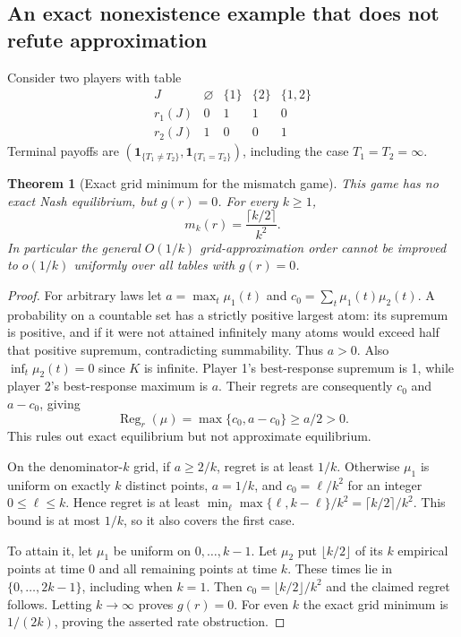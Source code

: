 \documentclass[11pt,a4paper]{article}
\newcommand{\ind}{\mathbf 1}
\DeclareMathOperator{\Reg}{Reg}
\newtheorem{theorem}{Theorem}[section]
\theoremstyle{definition}
\theoremstyle{remark}
\begin{document}
\subsection{An exact nonexistence example that does not refute approximation}
Consider two players with table
\[
\begin{array}{c|rrrr}
 J&\varnothing&\{1\}&\{2\}&\{1,2\}\\\hline
 r_1(J)&0&1&1&0\\
 r_2(J)&1&0&0&1
\end{array}
\]
Terminal payoffs are $(\ind_{\{T_1\ne T_2\}},\ind_{\{T_1=T_2\}})$, including the case $T_1=T_2=\infty$.

\begin{theorem}[Exact grid minimum for the mismatch game]
This game has no exact Nash equilibrium, but $g(r)=0$. For every $k\geq1$,
\[
 \boxed{\quad m_k(r)=\frac{\lceil k/2\rceil}{k^2}.\quad}
\]
In particular the general $O(1/k)$ grid-approximation order cannot be improved to $o(1/k)$ uniformly over all tables with $g(r)=0$.
\end{theorem}
\begin{proof}
For arbitrary laws let $a=\max_t\mu_1(t)$ and $c_0=\sum_t\mu_1(t)\mu_2(t)$. A probability on a countable set has a strictly positive largest atom: its supremum is positive, and if it were not attained infinitely many atoms would exceed half that positive supremum, contradicting summability. Thus $a>0$. Also $\inf_t\mu_2(t)=0$ since $K$ is infinite. Player 1's best-response supremum is 1, while player 2's best-response maximum is $a$. Their regrets are consequently $c_0$ and $a-c_0$, giving
\[
 \Reg_r(\mu)=\max\{c_0,a-c_0\}\geq a/2>0.
\]
This rules out exact equilibrium but not approximate equilibrium.

On the denominator-$k$ grid, if $a\geq2/k$, regret is at least $1/k$. Otherwise $\mu_1$ is uniform on exactly $k$ distinct points, $a=1/k$, and $c_0=\ell/k^2$ for an integer $0\leq\ell\leq k$. Hence regret is at least
$\min_{\ell}\max\{\ell,k-\ell\}/k^2=\lceil k/2\rceil/k^2$.
This bound is at most $1/k$, so it also covers the first case.

To attain it, let $\mu_1$ be uniform on $0,\ldots,k-1$. Let $\mu_2$ put $\lfloor k/2\rfloor$ of its $k$ empirical points at time 0 and all remaining points at time $k$. These times lie in $\{0,\ldots,2k-1\}$, including when $k=1$. Then $c_0=\lfloor k/2\rfloor/k^2$ and the claimed regret follows. Letting $k\to\infty$ proves $g(r)=0$. For even $k$ the exact grid minimum is $1/(2k)$, proving the asserted rate obstruction.
\end{proof}
\end{document}
